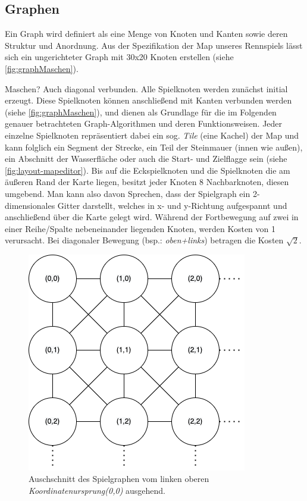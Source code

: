 \subsection{Graphen}
Ein Graph wird definiert als eine Menge von Knoten und Kanten sowie deren Struktur und Anordnung.
Aus der Spezifikation der Map unseres Rennspiels lässt sich ein ungerichteter Graph mit 30x20 Knoten erstellen (siehe \autoref{fig:graphMaschen}).\newline

Maschen?\newline
Auch diagonal verbunden.\newline
Alle Spielknoten werden zunächst initial erzeugt.
Diese Spielknoten können anschließend mit Kanten verbunden werden (siehe \autoref{fig:graphMaschen}), und dienen als Grundlage für die im Folgenden genauer betrachteten Graph-Algorithmen und deren Funktionsweisen.\newline
Jeder einzelne Spielknoten repräsentiert dabei ein sog. \textit{Tile} (eine Kachel) der Map und kann folglich ein Segment der Strecke, ein Teil der Steinmauer (innen wie außen), ein Abschnitt der Wasserfläche oder auch die Start- und Zielflagge sein (siehe \autoref{fig:layout-mapeditor}).\newline
Bis auf die Eckspielknoten und die Spielknoten die am äußeren Rand der Karte liegen, besitzt jeder Knoten 8 Nachbarknoten, diesen umgebend.
Man kann also davon Sprechen, dass der Spielgraph ein 2-dimensionales Gitter darstellt, welches in x- und y-Richtung aufgespannt und anschließend über die Karte gelegt wird.
Während der Fortbewegung auf zwei in einer Reihe/Spalte nebeneinander liegenden Knoten, werden Kosten von 1 verursacht. Bei diagonaler Bewegung (bsp.: \textit{oben+links}) betragen die Kosten $\sqrt{2}$.
\begin{figure}[h]
    \centering
    \includegraphics[scale=0.5]{pics/graph_maschen.png}
    \caption{Auschschnitt des Spielgraphen vom linken oberen \textit{Koordinatenursprung(0,0)} ausgehend.}
    \label{fig:graphMaschen}
\end{figure}